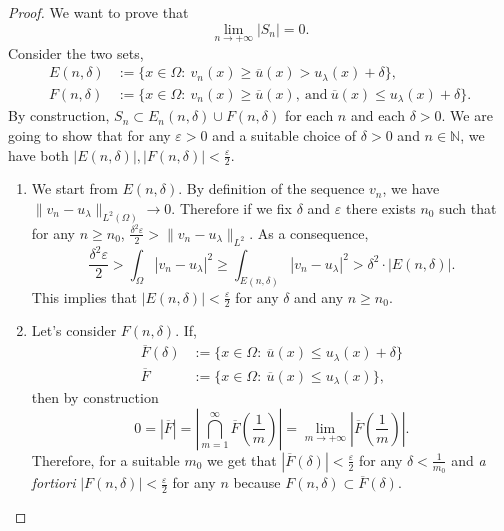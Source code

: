 \documentclass[11pt]{amsart}
\numberwithin{equation}{section} %
\theoremstyle{definition}
\def\N{\mathbb N}
\newcommand{\m}{\mbox}
\newcommand{\cor}{\textit}
\begin{document}
\begin{proof}
	We want to prove that 
	\begin{equation}\label{Sn0}
		\lim_{n\to+\infty}|S_n|=0.
	\end{equation}
	Consider the two sets,
	\begin{align*}
		E(n,\delta)&:=\{x\in \Omega:\ v_n(x)\geq\overline u(x)>u_\lambda(x)+\delta\},\\
		F(n,\delta)&:=\{x\in \Omega:\ v_n(x)\geq\overline u(x),\ \m{and}\ \overline u(x)\leq u_\lambda(x)+\delta\}.
	\end{align*}
	By construction, $S_n\subset E_n(n,\delta)\cup F(n,\delta)$ for each $n$ and each $\delta>0$.
	We are going to show that
	for any $\varepsilon>0$ and a suitable choice of $\delta>0$ and $n\in \N$, we have both $|E(n,\delta)|,|F(n,\delta)|<\frac{\varepsilon}{2}$.
	\begin{enumerate}
		\item We start from $E(n,\delta)$.
		By definition of the sequence $v_n$, we have $\|v_n-u_\lambda\|_{L^2(\Omega)}\to0$.
		Therefore if we fix $\delta$ and $\varepsilon$ there exists $n_0$ such that for any $n\geq n_0$,
		$\frac{\delta^2\varepsilon}{2}>\|v_n-u_\lambda\|_{L^2}$. As a consequence,
		\[
		\frac{\delta^2\varepsilon}{2}>\int_\Omega |v_n-u_\lambda|^2\geq\int_{E(n,\delta)}|v_n-u_\lambda|^2>\delta^2\cdot|E(n,\delta)|.
		\]
		This implies that $|E(n,\delta)|<\frac{\varepsilon}{2}$ for any $\delta$ and any $n\geq n_0$.
		
		\item Let's consider $F(n,\delta)$. If,
		\begin{align*}
			\overline F(\delta)&:=\{x\in \Omega:\ \overline u(x)\leq u_\lambda(x)+\delta\}\\
			\overline F&:=\{x\in \Omega:\ \overline u(x)\leq u_\lambda(x)\},
		\end{align*}
		then by construction
		\[
		0=|\overline F|=\left|\bigcap_{m=1}^\infty \overline F\left(\frac{1}{m}\right)\right|=\lim_{m\to+\infty}\left|\overline F\left(\frac{1}{m}\right)\right|.
		\]
		Therefore, for a suitable $m_0$ we get that $|\overline F(\delta)|<\frac{\varepsilon}{2}$ for any $\delta<\frac{1}{m_0}$
		and \cor{a fortiori} $|F(n,\delta)|<\frac{\varepsilon}{2}$ for any $n$ because $F(n,\delta)\subset\overline F(\delta)$.\newline
	\end{enumerate}
	

\end{proof}
\end{document}
